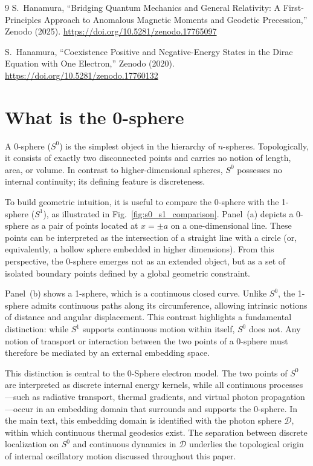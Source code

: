 \documentclass[%
 reprint,
 amsmath,amssymb,
 aps,
 prb,
]{revtex4-2}
\numberwithin{equation}{section}
\begin{document}
\begin{thebibliography}{9}
S.~Hanamura, ``Bridging Quantum Mechanics and General Relativity: A First-Principles Approach to Anomalous Magnetic Moments and Geodetic Precession,'' Zenodo (2025). \href{https://doi.org/10.5281/zenodo.17765097}{https://doi.org/10.5281/zenodo.17765097}

S.~Hanamura, ``Coexistence Positive and Negative-Energy States in the Dirac Equation with One Electron,'' Zenodo (2020). \href{https://doi.org/10.5281/zenodo.17760132}{https://doi.org/10.5281/zenodo.17760132}

\end{thebibliography}

\clearpage


\appendix


\section{What is the 0-sphere}
\label{sec:what_is_the_0_sphere}

A 0-sphere ($S^0$) is the simplest object in the hierarchy of $n$-spheres.
Topologically, it consists of exactly two disconnected points and carries no notion of length, area, or volume.
In contrast to higher-dimensional spheres, $S^0$ possesses no internal continuity; its defining feature is discreteness.

To build geometric intuition, it is useful to compare the 0-sphere with the 1-sphere ($S^1$), as illustrated in Fig.~\ref{fig:s0_s1_comparison}.
Panel~(a) depicts a 0-sphere as a pair of points located at $x=\pm a$ on a one-dimensional line.
These points can be interpreted as the intersection of a straight line with a circle (or, equivalently, a hollow sphere embedded in higher dimensions).
From this perspective, the 0-sphere emerges not as an extended object, but as a set of isolated boundary points defined by a global geometric constraint.

Panel~(b) shows a 1-sphere, which is a continuous closed curve.
Unlike $S^0$, the 1-sphere admits continuous paths along its circumference, allowing intrinsic notions of distance and angular displacement.
This contrast highlights a fundamental distinction: while $S^1$ supports continuous motion within itself, $S^0$ does not.
Any notion of transport or interaction between the two points of a 0-sphere must therefore be mediated by an external embedding space.

This distinction is central to the 0-Sphere electron model.
The two points of $S^0$ are interpreted as discrete internal energy kernels, while all continuous processes—such as radiative transport, thermal gradients, and virtual photon propagation—occur in an embedding domain that surrounds and supports the 0-sphere.
In the main text, this embedding domain is identified with the photon sphere $\mathcal{D}$, within which continuous thermal geodesics exist.
The separation between discrete localization on $S^0$ and continuous dynamics in $\mathcal{D}$ underlies the topological origin of internal oscillatory motion discussed throughout this paper.
\end{document}
